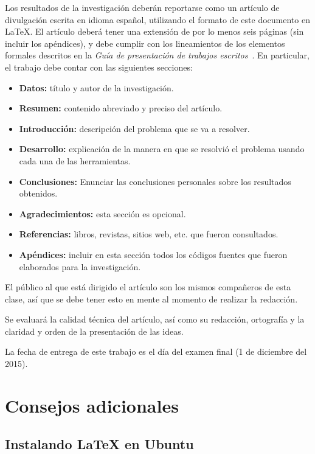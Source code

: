 \documentclass[10pt,letterpaper,oneside]{article}
\begin{document}
Los resultados de la investigación deberán reportarse como un artículo de divulgación escrita en idioma español, utilizando el formato de este documento en {\LaTeX}. El artículo deberá tener una extensión de por lo menos seis páginas (sin incluir los apéndices), y debe cumplir con los lineamientos de los elementos formales descritos en la \textit{Guía de presentación de trabajos escritos}~\cite{guia}. En particular, el trabajo debe contar con las siguientes secciones:
    
\begin{itemize}
    \item \textbf{Datos:} título y autor de la investigación. 
    \item \textbf{Resumen:} contenido abreviado y preciso del artículo. 
    \item \textbf{Introducción:} descripción del problema que se va a resolver.
    \item \textbf{Desarrollo:} explicación de la manera en que se resolvió el problema usando cada una de las herramientas.
    \item \textbf{Conclusiones:} Enunciar las conclusiones personales sobre los resultados obtenidos.
    \item \textbf{Agradecimientos:} esta sección es opcional.
    \item \textbf{Referencias:} libros, revistas, sitios web, etc. que fueron consultados.
    \item \textbf{Apéndices:} incluir en esta sección todos los códigos fuentes que fueron elaborados para la investigación.
\end{itemize}

El público al que está dirigido el artículo son los mismos compañeros de esta clase, así que se debe tener esto en mente al momento de realizar la redacción.

Se evaluará la calidad técnica del artículo, así como su redacción, ortografía y la claridad y orden de la presentación de las ideas. 

La fecha de entrega de este trabajo es el día del examen final (1 de diciembre del 2015).

\section{Consejos adicionales}

\subsection{Instalando {\LaTeX} en Ubuntu}
\end{document}
